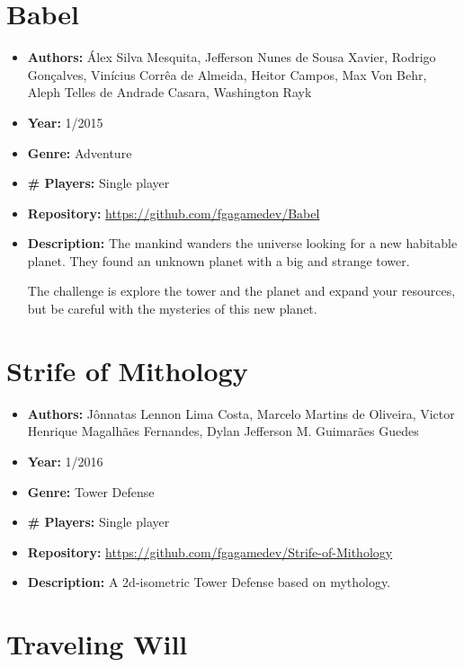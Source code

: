 \begin{apendicesenv}
\section{Babel}
\label {sec:babel}

\begin{itemize}
\item[] \textbf{Authors:} Álex Silva Mesquita, Jefferson Nunes de Sousa Xavier, Rodrigo Gonçalves, Vinícius Corrêa de Almeida, Heitor Campos, Max Von Behr, Aleph Telles de Andrade Casara, Washington Rayk
\item[] \textbf{Year:} 1/2015
\item[] \textbf{Genre:} Adventure
\item[] \textbf{\# Players:} Single player
\item[] \textbf{Repository:} \url{https://github.com/fgagamedev/Babel}
\item[] \textbf{Description:} The mankind wanders the universe looking for a new habitable planet. They found an unknown planet with a big and strange tower.

The challenge is explore the tower and the planet and expand your resources, but be careful with the mysteries of this new planet.
\end{itemize}

\section{Strife of Mithology}
\label {sec:strife}

\begin{itemize}
\item[] \textbf{Authors:} Jônnatas Lennon Lima Costa, Marcelo Martins de Oliveira, Victor Henrique Magalhães Fernandes, Dylan Jefferson M. Guimarães Guedes
\item[] \textbf{Year:} 1/2016
\item[] \textbf{Genre:} Tower Defense
\item[] \textbf{\# Players:} Single player
\item[] \textbf{Repository:} \url{https://github.com/fgagamedev/Strife-of-Mithology}
\item[] \textbf{Description:} A 2d-isometric Tower Defense based on mythology.
\end{itemize}

\section{Traveling Will}
\label {sec:traveling}


\end{apendicesenv}

